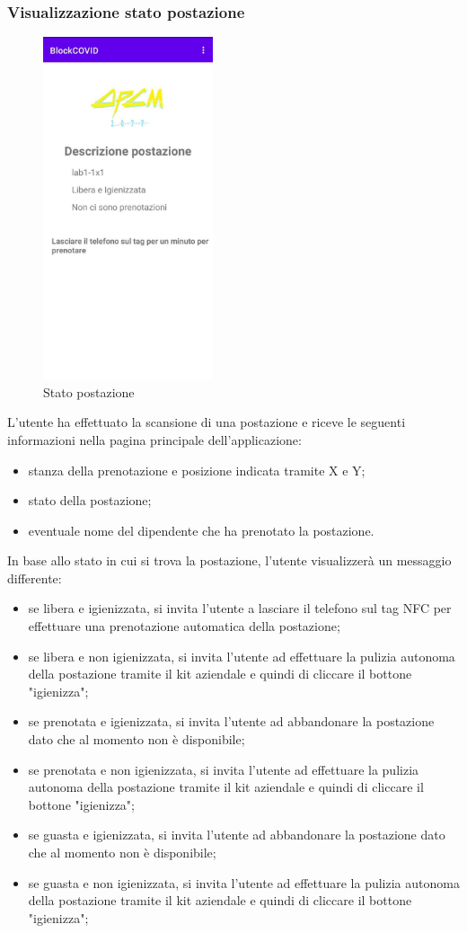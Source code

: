 \subsubsection{Visualizzazione stato postazione}
\begin{figure}[H]
	\centering
	\includegraphics[width=5cm]{res/images/DescrizionePostazione1.png}
	\caption{Stato postazione}
\end{figure}
L'utente ha effettuato la scansione di una postazione e riceve le seguenti informazioni nella pagina principale dell'applicazione:
\begin{itemize}
	\item stanza della prenotazione e posizione indicata tramite X e Y;
	\item stato della postazione;
	\item eventuale nome del dipendente che ha prenotato la postazione.
\end{itemize}
In base allo stato in cui si trova la postazione, l'utente visualizzerà un messaggio differente:
\begin{itemize}
	\item se libera e igienizzata, si invita l'utente a lasciare il telefono sul tag NFC per effettuare una prenotazione automatica della postazione;
	\item se libera e non igienizzata, si invita l'utente ad effettuare la pulizia autonoma della postazione tramite il kit aziendale e quindi di cliccare il bottone "igienizza";
	\item se prenotata e igienizzata, si invita l'utente ad abbandonare la postazione dato che al momento non è disponibile;
	\item se prenotata e non igienizzata, si invita l'utente ad effettuare la pulizia autonoma della postazione tramite il kit aziendale e quindi di cliccare il bottone "igienizza";
	\item se guasta e igienizzata, si invita l'utente ad abbandonare la postazione dato che al momento non è disponibile;
	\item se guasta e non igienizzata, si invita l'utente ad effettuare la pulizia autonoma della postazione tramite il kit aziendale e quindi di cliccare il bottone "igienizza";
\end{itemize}
 
